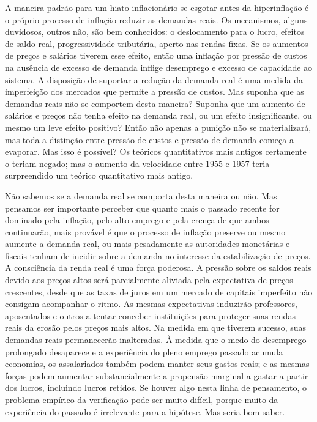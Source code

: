 \documentclass[12pt]{article}
\begin{document}
A maneira padrão para um hiato inflacionário se esgotar antes da hiperinflação é o próprio processo de inflação reduzir as demandas reais. Os mecanismos, alguns duvidosos, outros não, são bem conhecidos: o deslocamento para o lucro, efeitos de saldo real, progressividade tributária, aperto nas rendas fixas. Se os aumentos de preços e salários tiverem esse efeito, então uma inflação por pressão de custos na ausência de excesso de demanda inflige desemprego e excesso de capacidade ao sistema. A disposição de suportar a redução da demanda real é uma medida da imperfeição dos mercados que permite a pressão de custos. Mas suponha que as demandas reais não se comportem desta maneira? Suponha que um aumento de salários e preços não tenha efeito na demanda real, ou um efeito insignificante, ou mesmo um leve efeito positivo? Então não apenas a punição não se materializará, mas toda a distinção entre pressão de custos e pressão de demanda começa a evaporar. Mas isso é possível? Os teóricos quantitativos mais antigos certamente o teriam negado; mas o aumento da velocidade entre 1955 e 1957 teria surpreendido um teórico quantitativo mais antigo.

Não sabemos se a demanda real se comporta desta maneira ou não. Mas pensamos ser importante perceber que quanto mais o passado recente for dominado pela inflação, pelo alto emprego e pela crença de que ambos continuarão, mais provável é que o processo de inflação preserve ou mesmo aumente a demanda real, ou mais pesadamente as autoridades monetárias e fiscais tenham de incidir sobre a demanda no interesse da estabilização de preços. A consciência da renda real é uma força poderosa. A pressão sobre os saldos reais devido aos preços altos será parcialmente aliviada pela expectativa de preços crescentes, desde que as taxas de juros em um mercado de capitais imperfeito não consigam acompanhar o ritmo. As mesmas expectativas induzirão professores, aposentados e outros a tentar conceber instituições para proteger suas rendas reais da erosão pelos preços mais altos. Na medida em que tiverem sucesso, suas demandas reais permanecerão inalteradas. À medida que o medo do desemprego prolongado desaparece e a experiência do pleno emprego passado acumula economias, os assalariados também podem manter seus gastos reais; e as mesmas forças podem aumentar substancialmente a propensão marginal a gastar a partir dos lucros, incluindo lucros retidos. Se houver algo nesta linha de pensamento, o problema empírico da verificação pode ser muito difícil, porque muito da experiência do passado é irrelevante para a hipótese. Mas seria bom saber.
\end{document}
